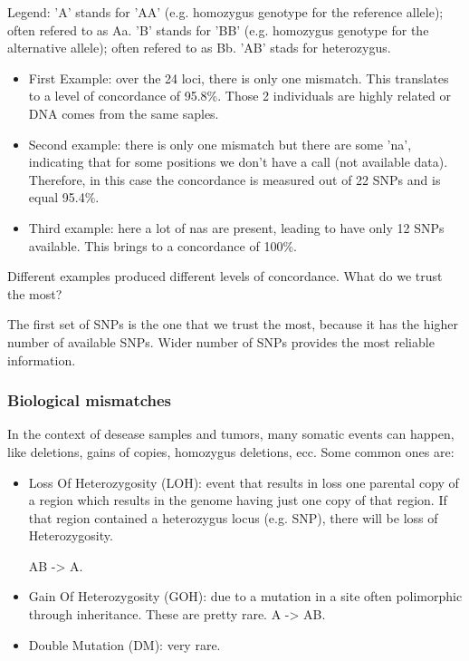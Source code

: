 Legend: 
'A' stands for 'AA' (e.g. homozygus genotype for the reference allele); often refered to as Aa.
'B' stands for 'BB' (e.g. homozygus genotype for the alternative allele); often refered to as Bb.
'AB' stads for heterozygus.

\begin{itemize}
	\item First Example: over the 24 loci, there is only one mismatch. This translates to a level of concordance of 95.8\%. Those 2 individuals are highly related or DNA comes from the same saples.    
	\item Second example: there is only one mismatch but there are some 'na', indicating that for some positions we don't have a call (not available data). Therefore, in this case the concordance is measured out of 22 SNPs and is equal 95.4\%. 
	\item Third example: here a lot of nas are present, leading to have only 12 SNPs available. This brings to a concordance of 100\%. 
\end{itemize}

Different examples produced different levels of concordance. What do we trust the most?

The first set of SNPs is the one that we trust the most, because it has the higher number of available SNPs. Wider number of SNPs provides the most reliable information. 

\subsubsection*{Biological mismatches}

In the context of desease samples and tumors, many somatic events can happen, like deletions, gains of copies, homozygus deletions, ecc. Some common ones are:
\begin{itemize}
	\item  Loss Of Heterozygosity (LOH):  event that results in loss one parental copy of a region which results in the genome having just one copy of that region. If that region contained a heterozygus locus (e.g. SNP), there will be loss of Heterozygosity.  
	
	AB -> A.
	\item Gain Of Heterozygosity (GOH): due to a mutation in a site often polimorphic through inheritance. These are pretty rare.
	A -> AB. 
	\item Double Mutation (DM): very rare.  
\end{itemize}

